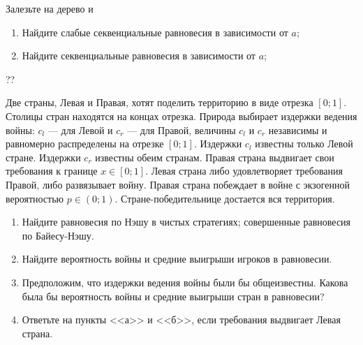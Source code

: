 \begin{problem}
\begin{source}
\cite{colell:mt}
\end{source}
Залезьте на дерево и


\begin{enumerate}
\item Найдите слабые секвенциальные равновесия в зависимости от  $a$;\par
\item Найдите секвенциальные равновесия в зависимости от  $a$;
\end{enumerate}


\begin{sol}

\end{sol}
\end{problem}







\begin{problem}\par
\begin{source} \cite{slanthcev:gt}?? \end{source}
Две страны, Левая и Правая, хотят поделить территорию в виде отрезка  $\left[0;1\right]$. Столицы стран находятся на концах отрезка. Природа выбирает издержки ведения войны:  $c_{l} $  --- для Левой и  $c_{r} $  --- для Правой, величины  $c_{l} $  и  $c_{r} $  независимы и равномерно распределены на отрезке  $\left[0;1\right]$. Издержки  $c_{l} $  известны только Левой стране. Издержки  $c_{r} $  известны обеим странам. Правая страна выдвигает свои требования к границе  $x\in \left[0;1\right]$. Левая страна либо удовлетворяет требования Правой, либо развязывает войну. Правая страна побеждает в войне с экзогенной вероятностью  $p\in \left(0;1\right)$. Стране-победительнице достается вся территория.\par
\begin{enumerate}
\item      Найдите равновесия по Нэшу в чистых стратегиях; совершенные равновесия по Байесу-Нэшу.\par
\item      Найдите вероятность войны и средние выигрыши игроков в равновесии.\par
\item       Предположим, что издержки ведения войны были бы общеизвестны. Какова была бы вероятность войны и средние выигрыши стран в равновесии?\par
\item      Ответьте на пункты <<а>> и <<б>>, если требования выдвигает Левая страна.
\end{enumerate}


\begin{sol}

\end{sol}
\end{problem}



